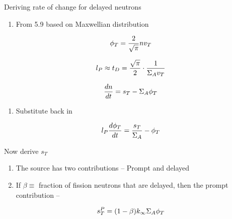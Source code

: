 \documentclass[aspectratio=1610,pdftex,dvipsnames,compress,xcolor={dvipsnames}]{beamer}
\begin{document}
\addtocounter{framenumber}{-1} 
\begin{frame}{Deriving rate of change for delayed neutrons}
    \begin{enumerate}[series=outerlist,topsep=0pt,itemsep=21pt,leftmargin=*,label=(\arabic*)]
        \item[]From 5.9 based on Maxwellian distribution
    \end{enumerate}

    \vspace*{\fill}

    \begin{equation}
        \LARGE
        \phi_T = \frac{2}{\sqrt{\pi}} nv_T
    \end{equation}

    \begin{equation}
        \LARGE
        l_P \approx t_D = \frac{\sqrt{\pi}}{2} \cdot \frac{1}{\Sigma_A v_T}
    \end{equation}

    \begin{equation}
        \LARGE
        \frac{dn}{dt} = s_T - \Sigma_A \phi_T
    \end{equation}

    \vspace*{\fill}

    \begin{enumerate}[series=outerlist,topsep=0pt,itemsep=21pt,leftmargin=*,label=(\arabic*)]
        \item[]Substitute back in
    \end{enumerate}

    \vspace*{\fill}

    \begin{equation}
        \LARGE
        l_P\frac{d\phi_T}{dt}=\frac{s_T}{\Sigma_A}-\phi_T
    \end{equation}
\end{frame}


\begin{frame}{Now derive $s_T$}
    \begin{enumerate}[series=outerlist,topsep=0pt,itemsep=21pt,leftmargin=*,label=(\arabic*)]
        \item[]The source has two contributions -- Prompt and delayed
        \item[]If $\beta \equiv$ fraction of fission neutrons that are delayed, then the prompt contribution --
    \end{enumerate}

    \vspace*{\fill}

    \begin{equation}
        \LARGE
        s_T^P = (1 - \beta) k_\infty \Sigma_A \phi_T
    \end{equation}
\end{frame}
\end{document}
